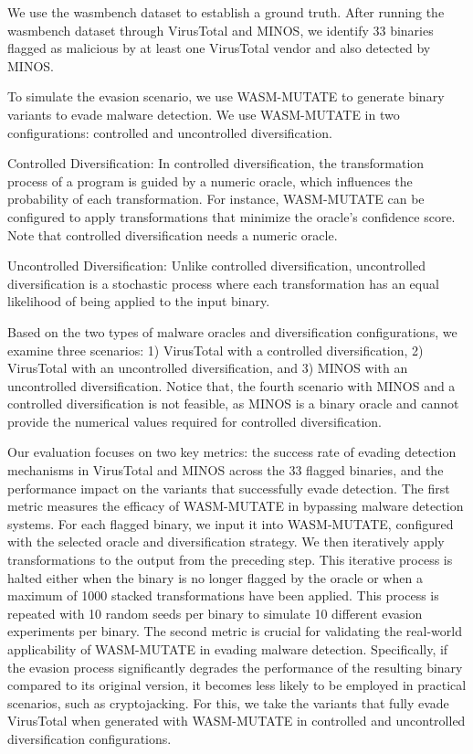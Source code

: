 We use the wasmbench dataset \cite{Hilbig2021AnES} to establish a ground truth. 
After running the wasmbench dataset through VirusTotal and MINOS, we identify 33 binaries flagged as malicious by at least one VirusTotal vendor and also detected by MINOS.

To simulate the evasion scenario, we use WASM-MUTATE to generate \Wasm binary variants to evade malware detection.
We use WASM-MUTATE in two configurations: controlled and uncontrolled diversification.

\begin{definition}{Controlled Diversification:}
    \label{controlled_def}
    In controlled diversification, the transformation process of a \Wasm program is guided by a numeric oracle, which influences the probability of each transformation. For instance, WASM-MUTATE can be configured to apply transformations that minimize the oracle's confidence score. Note that controlled diversification needs a numeric oracle.
\end{definition}


\begin{definition}{Uncontrolled Diversification:}
    \label{uncontrolled_def}
    Unlike controlled diversification, uncontrolled diversification is a stochastic process where each transformation has an equal likelihood of being applied to the input \Wasm binary.
\end{definition}


Based on the two types of malware oracles and diversification configurations, we examine three scenarios:
1) VirusTotal with a controlled diversification, 2) VirusTotal with an uncontrolled diversification, and 3) MINOS with an uncontrolled diversification.
Notice that, the fourth scenario with MINOS and a controlled diversification is not feasible, as MINOS is a binary oracle and cannot provide the numerical values required for controlled diversification.

Our evaluation focuses on two key metrics: the success rate of evading detection mechanisms in VirusTotal and MINOS across the 33 flagged binaries, and the performance impact on the variants that successfully evade detection.
The first metric measures the efficacy of WASM-MUTATE in bypassing malware detection systems. 
For each flagged binary, we input it into WASM-MUTATE, configured with the selected oracle and diversification strategy. 
We then iteratively apply transformations to the output from the preceding step. 
This iterative process is halted either when the binary is no longer flagged by the oracle or when a maximum of 1000 stacked transformations have been applied.
This process is repeated with 10 random seeds per binary to simulate 10 different evasion experiments per binary.
The second metric is crucial for validating the real-world applicability of WASM-MUTATE in evading malware detection. 
Specifically, if the evasion process significantly degrades the performance of the resulting binary compared to its original version, it becomes less likely to be employed in practical scenarios, such as cryptojacking.
For this, we take the variants that fully evade VirusTotal when generated with WASM-MUTATE in controlled and uncontrolled diversification configurations.

